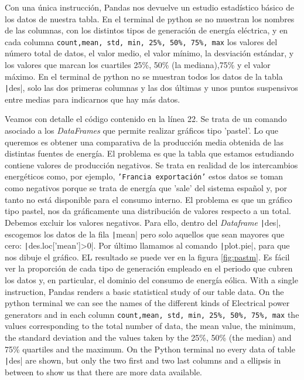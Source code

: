 \begin{paracol}{2}
Con una única instrucción, Pandas nos devuelve un estudio estadístico básico de los datos de nuestra tabla. En el terminal de python se no muestran los nombres de las columnas, con los distintos tipos de generación de energía eléctrica, y en cada columna \texttt{count,mean, std, min, 25\%, 50\%, 75\%, max} los valores del nú\-mero total de datos, el valor medio, el valor mínimo, la desviación estándar, y los valores que marcan los cuartiles 25\%, 50\% (la mediana),75\% y el valor máximo.  En el terminal de python no se muestran todos los datos de la tabla \texttt|des|, solo las dos primeras columnas y las dos últimas y unos puntos suspensivos entre medias para indicarnos que hay más datos. 

Veamos con detalle el código contenido en la línea 22. Se trata de un comando asociado a los \emph{DataFrames} que permite realizar gráficos tipo 'pastel'. Lo que queremos es obtener una comparativa de la producción media obtenida de las distintas fuentes de energía. El problema es que la tabla que estamos estudiando contiene valores de producción negativos. Se trata en realidad de los intercambios energéticos como, por ejemplo, \texttt{'Francia exportación'} estos datos se toman como negativos porque se trata de energía que 'sale' del sistema español y, por tanto no está disponible para el consumo interno. El problema es que un gráfico tipo pastel, nos da gráficamente una distribución de valores respecto a un total. Debemos excluir los valores negativos. Para ello, dentro del \emph{Dataframe} \texttt|des|, escogemos los datos de la fila \texttt|mean| pero solo aquellos que sean mayores que cero: \texttt|des.loc['mean']>0|. Por último llamamos al comando \texttt|plot.pie|, para que nos dibuje el gráfico. EL resultado se puede ver en la figura \ref{fig:pastm}. Es fácil ver la proporción de cada tipo de generación empleado en el periodo que cubren los datos y, en particular, el dominio del consumo de energía eólica.
\switchcolumn
With a single instruction, Pandas renders a basic statistical study of our table data. On the python terminal we can see the names of the different kinds of Electrical power generators and in each column \texttt{count,mean, std, min, 25\%, 50\%, 75\%, max} the values corresponding to the total number of data, the mean value, the minimum, the standard deviation and the values taken by the 25\%, 50\% (the  median) and 75\% quartiles and the maximum. On the Python terminal no every data of table  \texttt|des| are shown, but only the two first and two last columns and a ellipsis in between to show us that there are more data available.


\end{paracol}
